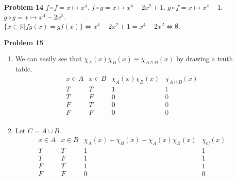 \documentclass{article}
\begin{document}
\textbf{Problem 14}
$f\circ f = x \mapsto x^4$. $f\circ g = x \mapsto x^4 -2x^2 + 1$. $g\circ f=x \mapsto x^4-1$. $g\circ g = x \mapsto x^4-2x^2$. \\
$\{x \in \mathbb{R}|fg(x)=gf(x)\} \Leftrightarrow x^4-2x^2+1=x^4-2x^2 \Leftrightarrow \emptyset$.
\bigbreak

\textbf{Problem 15}
\begin{enumerate}[label={(\roman*)}]
    \item 
    We can easily see that $\chi_A(x)\chi_B(x) \equiv \chi_{A\cap B}(x)$ by drawing a truth table.
    \begin{displaymath}
        \begin{array}{|c|c|c|c|}
        x\in A & x\in B & \chi_A(x)\chi_B(x) & \chi_{A\cap B}(x)\\ 
        \hline  
        T & T & 1 & 1 \\
        T & F & 0 & 0 \\
        F & T & 0 & 0 \\
        F & F & 0 & 0 \\
        \end{array}
    \end{displaymath}

    \item 
    Let $C = A \cup B$.
    \begin{displaymath}
        \begin{array}{|c|c|c|c|}
        x\in A & x\in B & \chi_A(x)+\chi_B(x)-\chi_A(x)\chi_B(x) & \chi_C(x)\\ 
        \hline  
        T & T & 1 & 1 \\
        T & F & 1 & 1 \\
        F & T & 1 & 1 \\
        F & F & 0 & 0 \\
        \end{array}
    \end{displaymath}
\end{enumerate}
\bigbreak
\end{document}
